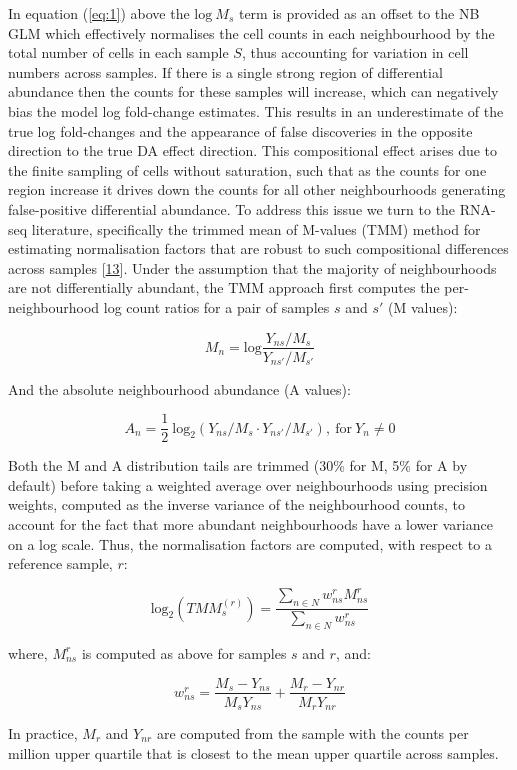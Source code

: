 \documentclass[
]{article}
\begin{document}
In equation (\ref{eq:1}) above the \(\mbox{log}\ M_s\) term is provided as an offset to the NB GLM which effectively normalises the cell counts in
each neighbourhood by the total number of cells in each sample \(S\), thus accounting for variation in cell numbers across samples. If there is a
single strong region of differential abundance then the counts for these samples will increase, which can negatively bias the model log fold-change
estimates. This results in an underestimate of the true log fold-changes and the appearance of false discoveries in the opposite direction to the
true DA effect direction. This compositional effect arises due to the finite sampling of cells without saturation, such that as the counts for one
region increase it drives down the counts for all other neighbourhoods generating false-positive differential abundance. To address this issue we
turn to the RNA-seq literature, specifically the trimmed mean of M-values (TMM) method for estimating normalisation factors that
are robust to such compositional differences across samples {[}\protect\hyperlink{ref-robinsonTMM2010}{13}{]}. Under the assumption that the majority of neighbourhoods are
not differentially abundant, the TMM approach first computes the per-neighbourhood log count ratios for a pair of samples \(s\) and \(s'\)
(M values):

\[ 
M_{n} = \mbox{log} \frac{Y_{ns}/M_s}{Y_{ns'}/M_{s'}}
\]

And the absolute neighbourhood abundance (A values):

\[
A_{n} = \frac{1}{2}\ \mbox{log}_{2} (Y_{ns}/M_{s} \cdot Y_{ns'}/M_{s'}),\ \mbox{for}\ Y_{n} \neq 0
\]

Both the M and A distribution tails are trimmed (30\% for M, 5\% for A by default) before taking a weighted average over neighbourhoods using precision weights,
computed as the inverse variance of the neighbourhood counts, to account for the fact that more abundant neighbourhoods have a lower variance on a
log scale. Thus, the normalisation factors are computed, with respect to a reference sample, \(r\):

\[
\mbox{log}_2(TMM_{s}^{(r)})= \frac{\sum_{n \in N} w^r_{ns}M^r_{ns}}{\sum_{n \in N} w^r_{ns}}
\]

where, \(M^r_{ns}\) is computed as above for samples \(s\) and \(r\), and:

\[
w^r_{ns} = \frac{M_s-Y_{ns}}{M_sY_{ns}} + \frac{M_r-Y_{nr}}{M_rY_{nr}}
\]

In practice, \(M_r\) and \(Y_{nr}\) are computed from the sample with the counts per million upper quartile that is closest to the mean upper quartile across samples.
\end{document}
